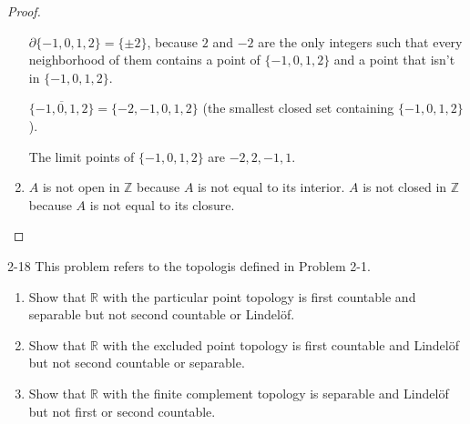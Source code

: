\begin{proof}
\begin{enumerate}[label={(\alph*)}]
		      $\partial\{ -1, 0, 1, 2 \} = \{ \pm 2 \}$, because $2$ and $-2$ are the only integers such that every neighborhood of them contains a point of $\{ -1, 0, 1, 2 \}$ and a point that isn't in $\{ -1, 0, 1, 2 \}$.

		      $\overline{\{ -1, 0, 1, 2 \}} = \{ -2, -1, 0, 1, 2 \}$ (the smallest closed set containing $\{ -1, 0, 1, 2 \}$).

		      The limit points of $\{ -1, 0, 1, 2 \}$ are $-2, 2, -1, 1$.
		\item $A$ is not open in $\mathbb{Z}$ because $A$ is not equal to its interior. $A$ is not closed in $\mathbb{Z}$ because $A$ is not equal to its closure.
	\end{enumerate}
\end{proof}

\begin{problem}{2-18}
This problem refers to the topologis defined in Problem 2-1.
\begin{enumerate}[label={(\alph*)}]
	\item Show that $\mathbb{R}$ with the particular point topology is first countable and separable but not second countable or Lindelöf.
	\item Show that $\mathbb{R}$ with the excluded point topology is first countable and Lindelöf but not second countable or separable.
	\item Show that $\mathbb{R}$ with the finite complement topology is separable and Lindelöf but not first or second countable.
\end{enumerate}
\end{problem}

